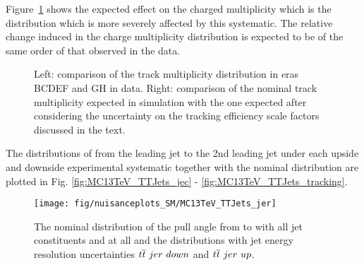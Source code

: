 \begin{description}
Figure~\ref{fig:tkeffsysts} shows the expected effect on the charged multiplicity which is the distribution which is more severely affected by this systematic. The relative change induced in the charge multiplicity distribution is expected to be of the same order of that observed in the data.

\begin{figure}[!htp]
\centering
{}
\caption{
Left: comparison of the track multiplicity distribution in eras BCDEF and GH in data.
Right: comparison of the nominal track multiplicity expected in simulation with the one expected after considering the uncertainty on the tracking efficiency scale factors discussed in the text.
}
\label{fig:tkeffsysts}
\end{figure}

The distributions of \pullangle from the leading jet \leadingjet to the 2nd leading jet \scndleadingjet under each upside and downside experimental systematic together with the nominal distribution are plotted in Fig. \ref{fig:MC13TeV_TTJets_jec} - \ref{fig:MC13TeV_TTJets_tracking}.

\begin{figure}[hbtp]
\centering
\def\twidth{0.45}
\texttt{[image: fig/nuisanceplots\_SM/MC13TeV\_TTJets\_jer]}
\caption{The nominal distribution of the pull angle from \leadingjet to \scndleadingjet with all jet constituents and at all \DeltaR and the distributions with jet energy resolution uncertainties $\ttbar\ jer\ down$ and $\ttbar\ jer\ up$.}
\label{fig:MC13TeV_TTJets_jer}
\end{figure}


\end{description}
